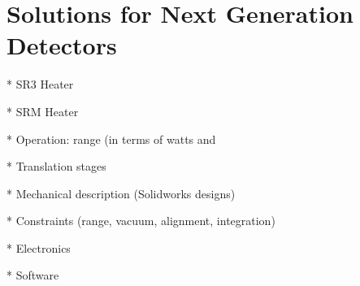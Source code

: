 \documentclass[10pt,a4paper]{book}
\begin{document}
\chapter{Solutions for Next Generation Detectors}

* SR3 Heater

* SRM Heater

* Operation: range (in terms of watts and %


* Translation stages

* Mechanical description (Solidworks designs)

* Constraints (range, vacuum, alignment, integration)

* Electronics 

* Software
	\listoffigures
	\listoftables
\end{document}
